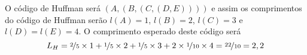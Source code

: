 \begin{questions}
\begin{solution}
    
    O código de Huffman será $(A,(B,(C,(D,E))))$ e assim os comprimentos do
    código de Huffman serão $l(A) = 1$, $l(B) = 2$, $l(C) = 3$ e $l(D)=l(E)=4$.
    O comprimento esperado deste código será
    \begin{equation}
    L_H = \nicefrac{2}{5} \times 1 + \nicefrac{1}{5} \times 2 + \nicefrac{1}{5} \times 3 + 2 \times \nicefrac{1}{10} \times 4 = \nicefrac{22}{10} = 2,2
    \end{equation}

\end{solution}
\end{questions}

